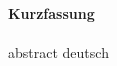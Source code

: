 
\begingroup
\large
\textbf{\LARGE Kurzfassung}\\
\parskip 12pt \\
abstract deutsch
\endgroup
\vspace*{\fill}

